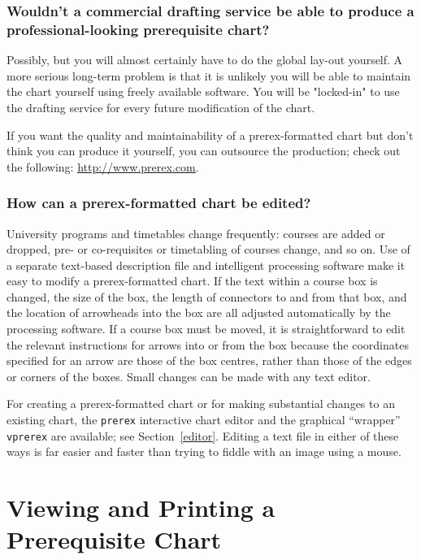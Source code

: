 \documentclass[11pt]{article}
\newcommand{\myurl}[1]{\textcolor{blue}{\underline{\textcolor{black}{\url{#1}}}}}
\begin{document}
\subsubsection*{Wouldn't a commercial drafting service be able to produce a professional-looking prerequisite chart?}

Possibly, but you will almost certainly have to do the global lay-out
yourself. A more serious long-term problem is that it is unlikely you will
be able to maintain the chart yourself using freely available software. You
will be "locked-in" to use the drafting service for every future
modification of the chart.

If you want the quality and maintainability of a prerex-formatted chart but
don't think you can produce it yourself, you can outsource the production;
check out the following:
\myurl{http://www.prerex.com}.

\subsubsection*{How can a prerex-formatted chart be edited?}
University programs and timetables
change frequently: courses are added or dropped,
pre- or co-requisites or timetabling of courses change, and so on. 
Use of a separate text-based description file and intelligent processing
software make it easy to modify a prerex-formatted chart. If the text within a course
box is changed, the size of the box, the length of connectors to and from
that box, and the location of arrowheads into the box are all adjusted
automatically by the processing software. If a course box must be moved, it
is straightforward to edit the relevant instructions for arrows into or
from the box because the coordinates specified for an arrow are those of
the box centres, rather than those of the edges or corners of the boxes.
Small changes can be made with any text editor. 

For creating a prerex-formatted chart or for 
making substantial changes to an existing chart, the \texttt{prerex} interactive chart editor 
and the graphical ``wrapper'' \texttt{vprerex} are available; 
see Section~\ref{editor}.
Editing a text file in either of these ways is far easier and
faster than trying to fiddle with an image using a mouse.


\section{Viewing and Printing a Prerequisite Chart}
\label{PDF}
\end{document}
